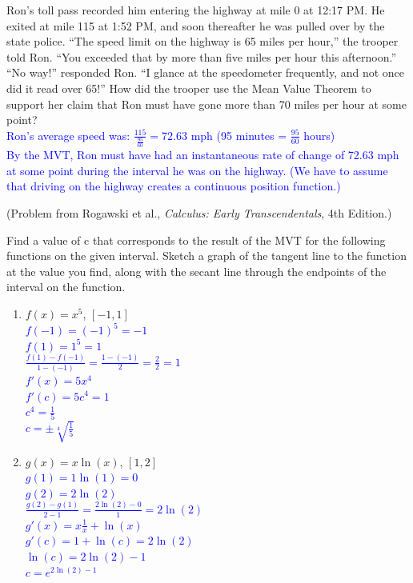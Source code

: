 \documentclass{ximera}
\begin{document}
\begin{exercise}
   Ron’s toll pass recorded him entering the highway at mile 0 at 12:17 PM. He exited at mile 115 at 1:52 PM, and soon thereafter he was pulled over by the state police. “The speed limit on the highway is 65 miles per hour,” the trooper told Ron. “You exceeded that by more than five miles per hour this afternoon.” “No way!” responded Ron. “I glance at the speedometer frequently, and not once did it read over 65!” How did the trooper use the Mean Value Theorem to support her claim that Ron must have gone more than 70 miles per hour at some point? \\
   \textcolor{blue}{Ron's average speed was: $\frac{115}{\frac{95}{60}}=72.63$ mph (95 minutes = $\frac{95}{60}$ hours)\\
    By the MVT, Ron must have had an instantaneous rate of change of 72.63 mph at some point during the interval he was on the highway.  (We have to assume that driving on the highway creates a continuous position function.)}

(Problem from Rogawski et al., \textit{Calculus: Early Transcendentals}, 4th Edition.)
\end{exercise}

\begin{exercise}
    Find a value of c that corresponds to the result of the MVT for the following functions on the given interval.  Sketch a graph of the tangent line to the function at the value you find, along with the secant line through the endpoints of the interval on the function.
   \begin{enumerate}
       \item $f(x)=x^5$, $[-1,1]$\\
       \textcolor{blue}{$f(-1)=(-1)^5=-1$\\
        $f(1)=1^5=1$\\
        $\frac{f(1)-f(-1)}{1-(-1)}=\frac{1-(-1)}{2}=\frac22=1$\\
        $f'(x)=5x^4$\\
        $f'(c)=5c^4=1$\\
        $c^4=\frac15$\\
        $c=\pm\sqrt[4]{\frac15}$}
       \item $g(x)=x\ln(x)$, $[1,2]$\\
       \textcolor{blue}{$g(1)=1\ln(1)=0$\\
        $g(2)=2\ln(2)$\\
        $\frac{g(2)-g(1)}{2-1}=\frac{2\ln(2)-0}{1}=2\ln(2)$\\
        $g'(x)=x\frac{1}{x}+\ln(x)$\\
        $g'(c)=1+\ln(c)=2\ln(2)$\\
        $\ln(c)=2\ln(2)-1$\\
        $c=e^{2\ln(2)-1}$}
   \end{enumerate}
\end{exercise}
\end{document}
